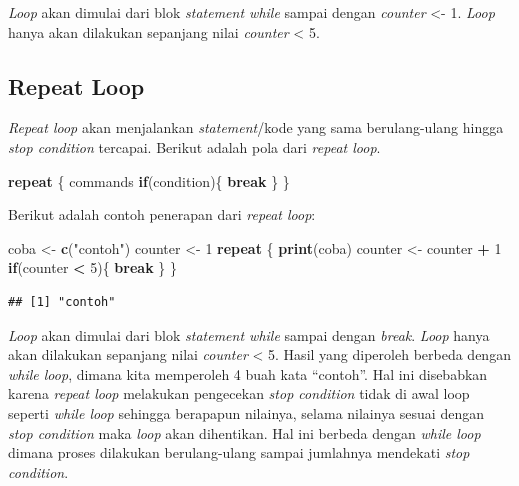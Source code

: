 \documentclass[
]{book}
\newenvironment{Shaded}{\begin{snugshade}}{\end{snugshade}}
\newcommand{\ControlFlowTok}[1]{\textcolor[rgb]{0.13,0.29,0.53}{\textbf{#1}}}
\newcommand{\DecValTok}[1]{\textcolor[rgb]{0.00,0.00,0.81}{#1}}
\newcommand{\FunctionTok}[1]{\textcolor[rgb]{0.13,0.29,0.53}{\textbf{#1}}}
\newcommand{\NormalTok}[1]{#1}
\newcommand{\OtherTok}[1]{\textcolor[rgb]{0.56,0.35,0.01}{#1}}
\newcommand{\SpecialCharTok}[1]{\textcolor[rgb]{0.81,0.36,0.00}{\textbf{#1}}}
\newcommand{\StringTok}[1]{\textcolor[rgb]{0.31,0.60,0.02}{#1}}
\theoremstyle{definition}
\theoremstyle{definition}
\theoremstyle{definition}
\theoremstyle{definition}
\theoremstyle{remark}
\begin{document}
\emph{Loop} akan dimulai dari blok \emph{statement while} sampai dengan \emph{counter} \textless- 1. \emph{Loop} hanya akan dilakukan sepanjang nilai \emph{counter} \textless{} 5.

\hypertarget{repeatloop}{%
\subsection{Repeat Loop}\label{repeatloop}}

\emph{Repeat loop} akan menjalankan \emph{statement}/kode yang sama berulang-ulang hingga \emph{stop condition} tercapai. Berikut adalah pola dari \emph{repeat loop}.

\begin{Shaded}
\begin{Highlighting}[]
\ControlFlowTok{repeat}\NormalTok{ \{}
\NormalTok{  commands}
  \ControlFlowTok{if}\NormalTok{(condition)\{}
    \ControlFlowTok{break}
\NormalTok{  \}}
\NormalTok{\}}
\end{Highlighting}
\end{Shaded}

Berikut adalah contoh penerapan dari \emph{repeat loop}:

\begin{Shaded}
\begin{Highlighting}[]
\NormalTok{coba }\OtherTok{\textless{}{-}} \FunctionTok{c}\NormalTok{(}\StringTok{"contoh"}\NormalTok{)}
\NormalTok{counter }\OtherTok{\textless{}{-}} \DecValTok{1}
\ControlFlowTok{repeat}\NormalTok{ \{}
  \FunctionTok{print}\NormalTok{(coba)}
\NormalTok{  counter }\OtherTok{\textless{}{-}}\NormalTok{ counter }\SpecialCharTok{+} \DecValTok{1}
  \ControlFlowTok{if}\NormalTok{(counter }\SpecialCharTok{\textless{}} \DecValTok{5}\NormalTok{)\{}
\ControlFlowTok{break}
\NormalTok{  \}}
\NormalTok{\}}
\end{Highlighting}
\end{Shaded}

\begin{verbatim}
## [1] "contoh"
\end{verbatim}

\emph{Loop} akan dimulai dari blok \emph{statement while} sampai dengan \emph{break}. \emph{Loop} hanya akan dilakukan sepanjang nilai \emph{counter} \textless{} 5. Hasil yang diperoleh berbeda dengan \emph{while loop}, dimana kita memperoleh 4 buah kata ``contoh''. Hal ini disebabkan karena \emph{repeat loop} melakukan pengecekan \emph{stop condition} tidak di awal loop seperti \emph{while loop} sehingga berapapun nilainya, selama nilainya sesuai dengan \emph{stop condition} maka \emph{loop} akan dihentikan. Hal ini berbeda dengan \emph{while loop} dimana proses dilakukan berulang-ulang sampai jumlahnya mendekati \emph{stop condition}.
\end{document}
